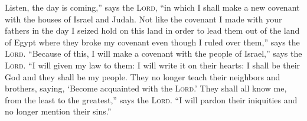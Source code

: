 
\begin{inparaenum}
    
    
    
    
    
    
    
    
     Listen, the day is coming,'' says the \textsc{Lord}, ``in which I shall make a new covenant with the houses of Israel and Judah.%
     Not like the covenant I made with your fathers in the day I seized hold on this land in order to lead them out of the land of Egypt where they broke my covenant even though I ruled over them,'' says the \textsc{Lord}.%
     ``Because of this, I will make a covenant with the people of Israel,'' says the \textsc{Lord}. ``I will given my law to them: I will write it on their hearts: I shall be their God and they shall be my people.%
     They no longer teach their neighbors and brothers, saying, `Become acquainted with the \textsc{Lord}.' They shall all know me, from the least to the greatest,'' says the \textsc{Lord}. ``I will pardon their iniquities and no longer mention their sins.''%
    
    
    
\end{inparaenum}
